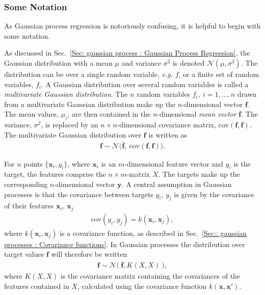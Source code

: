 \documentclass[twoside,english]{uiofysmaster}
\begin{document}
\subsubsection{Some Notation}

As Gaussian process regression is notoriously confusing, it is helpful to begin with some notation. 

As discussed in Sec.~\ref{Sec: gaussian process : Gaussian Process Regression}, the Gaussian distribution with a mean $\mu$ and variance $\sigma^2$ is denoted $\mathcal{N}(\mu, \sigma^2)$. The distribution can be over a single random variable, \textit{e.g.} $f$, or a finite set of random variables, $f_i$. A Gaussian distribution over several random variables is called a \textit{multivariate Gaussian distribution}. The $n$ random variables $f_i, ~i=1,...,n$ drawn from a multivariate Gaussian distribution make up the $n$-dimensional vector $\textbf{f}$. The mean values, $\mu_i$, are then contained in the $n$-dimensional \textit{mean vector} $\bar{\textbf{f}}$. The variance, $\sigma^2$, is replaced by an $n \times n$-dimensional covariance matrix, $\text{cov}(\textbf{f}, \textbf{f})$. The multivariate Gaussian distribution over $\textbf{f}$ is written as
\begin{align}
\textbf{f} \sim \mathcal{N} \big(\bar{\textbf{f}}, ~\text{cov}(\textbf{f},\textbf{f})  \big).
\end{align}  

For $n$ points $\{\textbf{x}_i , y_i\}$, where $\textbf{x}_i$ is an $m$-dimensional feature vector and $y_i$ is the target, the features comprise the $n \times m$-matrix $X$. The targets make up the corresponding $n$-dimensional vector $\textbf{y}$. A central assumption in Gaussian processes is that the covariance between targets $y_i$, $y_j$ is given by the covariance of their features $\textbf{x}_i$, $\textbf{x}_j$
\begin{align}
\text{cov}(y_i, y_j) = k(\textbf{x}_i, \textbf{x}_j),
\end{align}
where $k(\textbf{x}_i, \textbf{x}_j)$ is a covariance function, as described in Sec.~\ref{Sec:: gaussian processes : Covariance functions}. In Gaussian processes the distribution over target values $\textbf{f}$ will therefore be written
\begin{align}\label{Eq:: gaussian process : Normal distribution GP}
\textbf{f} \sim \mathcal{N} \big(~\bar{ \textbf{f} }, K(X, X) ~\big),
\end{align}
where $K(X,X)$ is the covariance matrix containing the covariances of the features contained in $X$, calculated using the covariance function $k(\textbf{x}, \textbf{x}')$.
\end{document}
